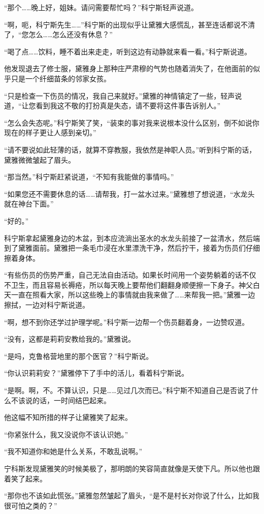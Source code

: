 “那个……晚上好，姐妹。请问需要帮忙吗？”科宁斯轻声说道。

“啊，呃，科宁斯先生……”科宁斯的出现似乎让黛雅大感慌乱，甚至连话都说不清了，“您怎么……怎么还没有休息？”

“喝了点……饮料，睡不着出来走走，听到这边有动静就来看一看。”科宁斯说道。

他发现退去了修士服，黛雅身上那种庄严肃穆的气势也随着消失了，在他面前的似乎只是一个纤细苗条的邻家女孩。

“只是检查一下伤员的情况，我自己来就好。”黛雅的神情镇定了一些，轻声说道，“让您看到我这不敬的打扮真是失态，请不要将这件事告诉别人。”

“怎么会失态呢。”科宁斯笑了笑，“装束的事对我来说根本没什么区别，倒不如说你现在的样子更让人感到亲切。”

“请不要说如此轻薄的话，就算不穿教服，我依然是神职人员。”听到科宁斯的话，黛雅微微皱起了眉头。

“那当然。”科宁斯赶紧说道，“不知有我能做的事情吗。”

“如果您还不需要休息的话……请帮我，打一盆水过来。”黛雅想了想说道，“水龙头就在神台下面。”

“好的。”

科宁斯拿起黛雅身边的木盆，到本应流淌出圣水的水龙头前接了一盆清水，然后端到了黛雅面前。黛雅把一条毛巾浸在水里漂洗干净，然后拧干，接着为伤员们仔细擦着身体。

“有些伤员的伤势严重，自己无法自由活动。如果长时间用一个姿势躺着的话不仅不卫生，而且容易长褥疮，所以每天晚上要帮他们翻翻身顺便擦一下身子。神父白天一直在照看大家，所以这些晚上的事情就由我来做了……来帮我一把。”黛雅一边擦拭，一边对科宁斯说道。

“啊，想不到你还学过护理学呢。”科宁斯一边帮一个伤员翻着身，一边赞叹道。

“没有，这都是莉莉安教给我的。”黛雅说。

“是吗，克鲁格营地里的那个医官？”科宁斯说。

“你认识莉莉安？”黛雅停下了手中的活儿，看着科宁斯说。

“是啊。啊，不。不算认识，只是……见过几次而已。”科宁斯不知道自己是否说了什么不该说的话，一时间结巴起来。

他这幅不知所措的样子让黛雅笑了起来。

“你紧张什么，我又没说你不该认识她。”

“我不知道你和她是什么关系，不敢乱说啊。”

宁科斯发现黛雅笑的时候美极了，那明朗的笑容简直就像是天使下凡。所以他也跟着笑了起来。

“那你也不该如此慌张。”黛雅忽然皱起了眉头，“是不是村长对你说了什么，比如我很可怕之类的？”

